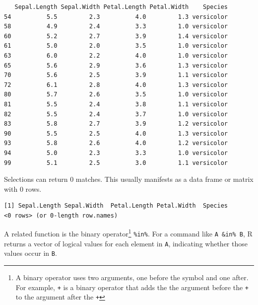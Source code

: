 \documentclass[
  13,
  letterpaper,
]{report}
\newenvironment{Shaded}{\begin{snugshade}}{\end{snugshade}}
\newcommand{\DecValTok}[1]{\textcolor[rgb]{0.68,0.00,0.00}{#1}}
\newcommand{\NormalTok}[1]{\textcolor[rgb]{0.00,0.23,0.31}{#1}}
\newcommand{\OtherTok}[1]{\textcolor[rgb]{0.00,0.23,0.31}{#1}}
\newcommand{\SpecialCharTok}[1]{\textcolor[rgb]{0.37,0.37,0.37}{#1}}
\newcommand{\StringTok}[1]{\textcolor[rgb]{0.13,0.47,0.30}{#1}}
\begin{document}
\begin{verbatim}
   Sepal.Length Sepal.Width Petal.Length Petal.Width    Species
54          5.5         2.3          4.0         1.3 versicolor
58          4.9         2.4          3.3         1.0 versicolor
60          5.2         2.7          3.9         1.4 versicolor
61          5.0         2.0          3.5         1.0 versicolor
63          6.0         2.2          4.0         1.0 versicolor
65          5.6         2.9          3.6         1.3 versicolor
70          5.6         2.5          3.9         1.1 versicolor
72          6.1         2.8          4.0         1.3 versicolor
80          5.7         2.6          3.5         1.0 versicolor
81          5.5         2.4          3.8         1.1 versicolor
82          5.5         2.4          3.7         1.0 versicolor
83          5.8         2.7          3.9         1.2 versicolor
90          5.5         2.5          4.0         1.3 versicolor
93          5.8         2.6          4.0         1.2 versicolor
94          5.0         2.3          3.3         1.0 versicolor
99          5.1         2.5          3.0         1.1 versicolor
\end{verbatim}

Selections can return 0 matches. This usually manifests as a data frame
or matrix with 0 rows.

\begin{Shaded}
\end{Shaded}

\begin{verbatim}
[1] Sepal.Length Sepal.Width  Petal.Length Petal.Width  Species     
<0 rows> (or 0-length row.names)
\end{verbatim}

A related function is the binary operator\footnote{A binary operator
  uses two arguments, one before the symbol and one after. For example,
  \texttt{+} is a binary operator that adds the the argument before the
  \texttt{+} to the argument after the \texttt{+}} \texttt{\%in\%}. For
a command like \texttt{A\ \&in\%\ B}, R returns a vector of logical
values for each element in \texttt{A}, indicating whether those values
occur in \texttt{B}.
\end{document}
